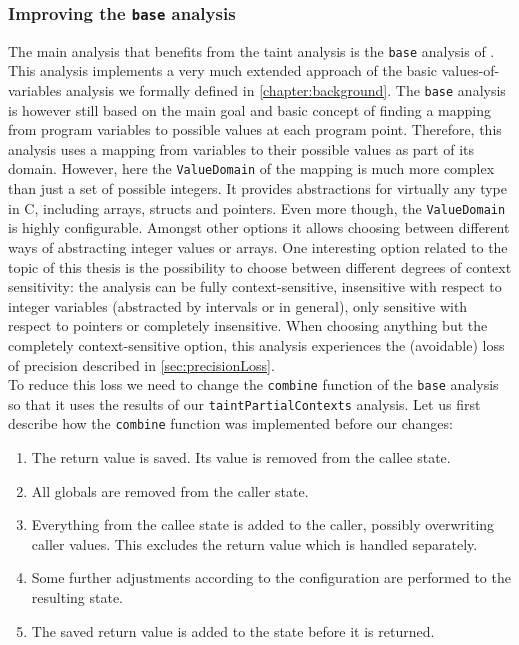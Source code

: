     \subsubsection{Improving the \texttt{base} analysis}
      The main analysis that benefits from the taint analysis is the \texttt{base} analysis of \gob. This analysis implements a very much extended approach of the basic values-of-variables analysis we formally defined in \autoref{chapter:background}. The \texttt{base} analysis is however still based on the main goal and basic concept of finding a mapping from program variables to possible values at each program point. Therefore, this analysis uses a mapping from variables to their possible values as part of its domain. However, here the \texttt{ValueDomain} of the mapping is much more complex than just a set of possible integers. It provides abstractions for virtually any type in C, including arrays, structs and pointers. Even more though, the \texttt{ValueDomain} is highly configurable. Amongst other options it allows choosing between different ways of abstracting integer values or arrays. One interesting option related to the topic of this thesis is the possibility to choose between different degrees of context sensitivity: the analysis can be fully context-sensitive, insensitive with respect to integer variables (abstracted by intervals or in general), only sensitive with respect to pointers or completely insensitive. When choosing anything but the completely context-sensitive option, this analysis experiences the (avoidable) loss of precision described in \autoref{sec:precisionLoss}.\\
      To reduce this loss we need to change the \texttt{combine} function of the \texttt{base} analysis so that it uses the results of our \texttt{taintPartialContexts} analysis. Let us first describe how the \texttt{combine} function was implemented before our changes:
      \begin{enumerate}
        \item The return value is saved. Its value is removed from the callee state.
        \item All globals are removed from the caller state.
        \item Everything from the callee state is added to the caller, possibly overwriting caller values. This excludes the return value which is handled separately.
        \item Some further adjustments according to the configuration are performed to the resulting state.
        \item The saved return value is added to the state before it is returned.
      \end{enumerate}

